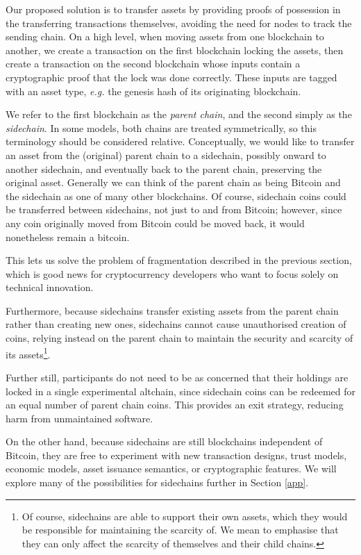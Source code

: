\documentclass[letterpaper]{article}
\newcommand{\mainchain}{parent chain\xspace}
\newcommand{\sidechain}{sidechain\xspace}
\newcommand{\sidechains}{sidechains\xspace}
\newcommand{\sidecoins}{sidechain coins\xspace}
\newcommand{\altchain}{altchain\xspace}
\begin{document}
Our proposed solution is to transfer assets by providing proofs of possession in the
transferring transactions themselves, avoiding the need for nodes to
track the sending chain. On a high level, when moving assets from one
blockchain to another, we create a transaction on the first blockchain
locking the assets, then create a transaction on the second blockchain
whose inputs contain a cryptographic proof that the lock was done correctly.
These inputs are tagged with an asset type, \emph{e.g.} the genesis hash of
its originating blockchain.

We refer to the first blockchain as the \emph{\mainchain}, and the second simply as
the \emph{\sidechain}. In some models, both chains are treated symmetrically,
so this terminology should be considered relative. Conceptually, we would like to
transfer an asset from the (original) \mainchain to a \sidechain, possibly onward to another
\sidechain, and eventually back to the \mainchain, preserving the original asset.
Generally we can think of the \mainchain as being Bitcoin and the \sidechain
as one of many other blockchains. Of course, \sidecoins
could be transferred between \sidechains, not just to and from Bitcoin;
however, since any coin originally moved from Bitcoin could be moved back,
it would nonetheless remain a bitcoin.

This lets us solve the problem of fragmentation described in the previous section, which
is good news for cryptocurrency developers who want to focus solely
on technical innovation.

Furthermore, because \sidechains transfer existing assets from the \mainchain rather than creating new ones, \sidechains cannot cause unauthorised creation
of coins, relying instead on the \mainchain to maintain the security and scarcity of its
assets\footnote{Of course, \sidechains are able to support their own assets, which they
would be responsible for maintaining the scarcity of. We mean to emphasise that they can only affect the scarcity of themselves and their child chains.}.

Further still, participants do not need to be as concerned that their holdings
are locked in a single experimental \altchain, since \sidecoins can be
redeemed for an equal number of \mainchain coins. This provides an exit
strategy, reducing harm from unmaintained software.

On the other hand, because \sidechains are still blockchains independent of
Bitcoin, they are free to experiment with new transaction designs, trust
models, economic models, asset issuance semantics, or cryptographic features.
We will explore many of the possibilities for \sidechains further in Section
\ref{app}.
\end{document}
